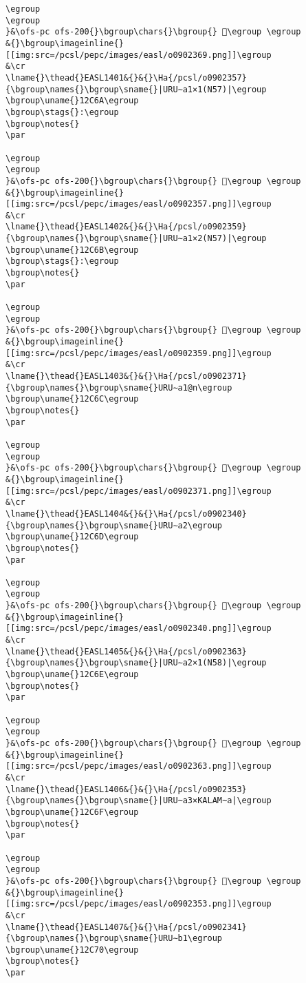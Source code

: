 \begin{verbatim}
\egroup
\egroup
}&\ofs-pc ofs-200{}\bgroup\chars{}\bgroup{} 𒱩\egroup \egroup
&{}\bgroup\imageinline{}[[img:src=/pcsl/pepc/images/easl/o0902369.png]]\egroup
&\cr
\lname{}\thead{}EASL1401&{}&{}\Ha{/pcsl/o0902357}{\bgroup\names{}\bgroup\sname{}|URU∼a1×1(N57)|\egroup
\bgroup\uname{}12C6A\egroup
\bgroup\stags{}:\egroup
\bgroup\notes{}
\par 

\egroup
\egroup
}&\ofs-pc ofs-200{}\bgroup\chars{}\bgroup{} 𒱪\egroup \egroup
&{}\bgroup\imageinline{}[[img:src=/pcsl/pepc/images/easl/o0902357.png]]\egroup
&\cr
\lname{}\thead{}EASL1402&{}&{}\Ha{/pcsl/o0902359}{\bgroup\names{}\bgroup\sname{}|URU∼a1×2(N57)|\egroup
\bgroup\uname{}12C6B\egroup
\bgroup\stags{}:\egroup
\bgroup\notes{}
\par 

\egroup
\egroup
}&\ofs-pc ofs-200{}\bgroup\chars{}\bgroup{} 𒱫\egroup \egroup
&{}\bgroup\imageinline{}[[img:src=/pcsl/pepc/images/easl/o0902359.png]]\egroup
&\cr
\lname{}\thead{}EASL1403&{}&{}\Ha{/pcsl/o0902371}{\bgroup\names{}\bgroup\sname{}URU∼a1@n\egroup
\bgroup\uname{}12C6C\egroup
\bgroup\notes{}
\par 

\egroup
\egroup
}&\ofs-pc ofs-200{}\bgroup\chars{}\bgroup{} 𒱬\egroup \egroup
&{}\bgroup\imageinline{}[[img:src=/pcsl/pepc/images/easl/o0902371.png]]\egroup
&\cr
\lname{}\thead{}EASL1404&{}&{}\Ha{/pcsl/o0902340}{\bgroup\names{}\bgroup\sname{}URU∼a2\egroup
\bgroup\uname{}12C6D\egroup
\bgroup\notes{}
\par 

\egroup
\egroup
}&\ofs-pc ofs-200{}\bgroup\chars{}\bgroup{} 𒱭\egroup \egroup
&{}\bgroup\imageinline{}[[img:src=/pcsl/pepc/images/easl/o0902340.png]]\egroup
&\cr
\lname{}\thead{}EASL1405&{}&{}\Ha{/pcsl/o0902363}{\bgroup\names{}\bgroup\sname{}|URU∼a2×1(N58)|\egroup
\bgroup\uname{}12C6E\egroup
\bgroup\notes{}
\par 

\egroup
\egroup
}&\ofs-pc ofs-200{}\bgroup\chars{}\bgroup{} 𒱮\egroup \egroup
&{}\bgroup\imageinline{}[[img:src=/pcsl/pepc/images/easl/o0902363.png]]\egroup
&\cr
\lname{}\thead{}EASL1406&{}&{}\Ha{/pcsl/o0902353}{\bgroup\names{}\bgroup\sname{}|URU∼a3×KALAM∼a|\egroup
\bgroup\uname{}12C6F\egroup
\bgroup\notes{}
\par 

\egroup
\egroup
}&\ofs-pc ofs-200{}\bgroup\chars{}\bgroup{} 𒱯\egroup \egroup
&{}\bgroup\imageinline{}[[img:src=/pcsl/pepc/images/easl/o0902353.png]]\egroup
&\cr
\lname{}\thead{}EASL1407&{}&{}\Ha{/pcsl/o0902341}{\bgroup\names{}\bgroup\sname{}URU∼b1\egroup
\bgroup\uname{}12C70\egroup
\bgroup\notes{}
\par 


\end{verbatim}

